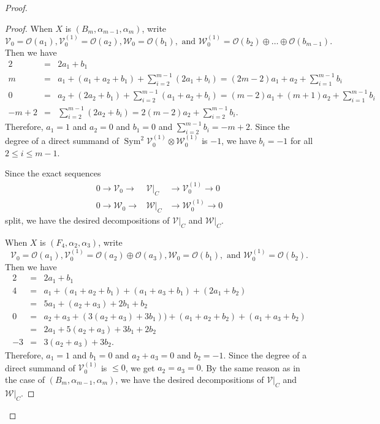 \documentclass[12pt]{amsart}
\theoremstyle{plain}
\theoremstyle{definition}
\def\Sym{\operatorname{Sym}}
\begin{document}
\begin{proof}
\begin{proof}
\medskip
When $X$ is $(B_m, \alpha_{m-1}, \alpha_m)$, write $$\mathcal V_0  =\mathcal O(a_1), \mathcal V_0^{(1)}=\mathcal O(a_2), \mathcal W_0 =\mathcal O(b_1), \text{ and } \mathcal W_0^{(1)}=\mathcal O(b_2) \oplus \dots \oplus \mathcal O(b_{m-1}).$$
Then we have
\begin{eqnarray*}
2&=& 2a_1 + b_1 \\
m&=& a_1 +(a_1 +a_2 +b_1) + \sum_{i=2}^{m-1}(2a_1+b_i) =(2m-2)a_1 + a_2 + \sum_{i=1}^{m-1}b_i \\
0&=&a_2 + (2a_2 + b_1) + \sum_{i=2}^{m-1}(a_1 +a_2 + b_i) = (m-2)a_1 + (m+1) a_2 + \sum_{i=1}^{m-1} b_i \\
-m+2 &=& \sum_{i=2}^{m-1}(2a_2 + b_i) = 2(m-2) a_2+ \sum_{i=2}^{m-1} b_i.
\end{eqnarray*}
Therefore, $a_1=1$ and $a_2=0$ and $b_1=0$ and $\sum_{i=2}^{m-1} b_i = -m+2$.
Since the degree of a direct summand of $\Sym^2 \mathcal V_0^{(1)} \otimes \mathcal W_0^{(1)}$ is $  -1$, we have $b_i=-1$ for all $2 \leq i \leq m-1$.

Since the exact sequences
 \begin{eqnarray*}
 0 \rightarrow \mathcal V_0 \rightarrow &\mathcal V|_C& \rightarrow \mathcal V_0^{(1)} \rightarrow 0\\
 0 \rightarrow \mathcal W_0 \rightarrow &\mathcal W|_C& \rightarrow \mathcal W_0^{(1)} \rightarrow 0
 \end{eqnarray*}
split, we have the desired decompositions of
$\mathcal V|_C$ and $\mathcal W|_C$.


\medskip
When $X$ is $(F_4, \alpha_{2}, \alpha_3)$, write
$$\mathcal V_0  =\mathcal O(a_1), \mathcal V_0^{(1)}=   \mathcal O(a_2)\oplus \mathcal O(a_3), \mathcal W_0 =\mathcal O(b_1), \text{ and } \mathcal W_0^{(1)}= \mathcal O(b_2).$$
 Then we have
 \begin{eqnarray*}
 2&=& 2a_1 + b_1 \\
 4&=& a_1 + (a_1 +a_2 +b_1) +(a_1+a_3 +b_1) +(2a_1+b_2) \\
 &=& 5a_1 +(a_2 +a_3) +2 b_1 +b_2 \\
 0&=& a_2+a_3 + (3(a_2 +a_3) + 3 b_1)) + (a_1 +a_2 + b_2) + (a_1 +a_3+ b_2)\\
 &=& 2a_1 + 5(a_2 +a_3) +3 b_1 +2 b_2  \\
 -3&=& 3(a_2+a_3) +3b_2.
 \end{eqnarray*}
Therefore, $a_1=1$ and $b_1=0$ and $a_2+a_3=0$ and $b_2=-1$.
Since the degree of a direct summand of $\mathcal V_0^{(1)}$ is $\leq 0$, we get $a_2=a_3=0$.
By the same reason as in the case of $(B_m, \alpha_{m-1}, \alpha_m)$,  we have the desired decompositions of
$\mathcal V|_C$ and $\mathcal W|_C$.


\end{proof}
\end{proof}
\end{document}
